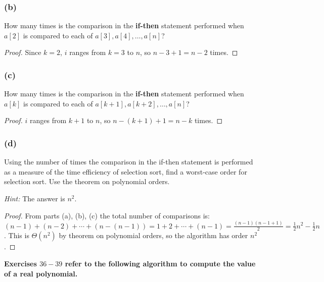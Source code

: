 \documentclass[14pt]{extarticle}
\newcommand{\cy}{\color{cyan}}
\begin{document}
\subsubsection{(b)}
How many times is the comparison in the {\bf if-then} statement performed when \(a[2]\) is compared to each of
\(a[3], a[4], \ldots, a[n]\)?

\begin{proof}
    Since \(k = 2\), \(i\) ranges from \(k=3\) to \(n\), so \(n-3+1 = n-2\) times.
\end{proof}

\subsubsection{(c)}
How many times is the comparison in the {\bf if-then} statement performed when \(a[k]\) is compared to each of
\(a[k+1], a[k+2], \ldots, a[n]\)?

\begin{proof}
    \(i\) ranges from \(k+1\) to \(n\), so \(n-(k+1)+1 = n-k\) times.
\end{proof}

\subsubsection{(d)}
Using the number of times the comparison in the if-then statement is performed as a measure of the time efficiency of
selection sort, find a worst-case order for selection sort. Use the theorem on polynomial orders.

    {\it Hint:} The answer is \(n^2\).

\begin{proof}
    From parts (a), (b), (c) the total number of comparisons is: \((n-1) + (n-2) + \cdots + (n-(n-1)) = 1+2+\cdots+(n-1) =
    \frac{(n-1)(n-1+1)}{2} = \frac{1}{2}n^2 - \frac{1}{2}n\). This is \(\Theta(n^2)\) by theorem on polynomial orders, so the
    algorithm has order \(n^2\).
\end{proof}

{\bf \cy Exercises \(36-39\) refer to the following algorithm to compute the value of a real polynomial.}
\end{document}
